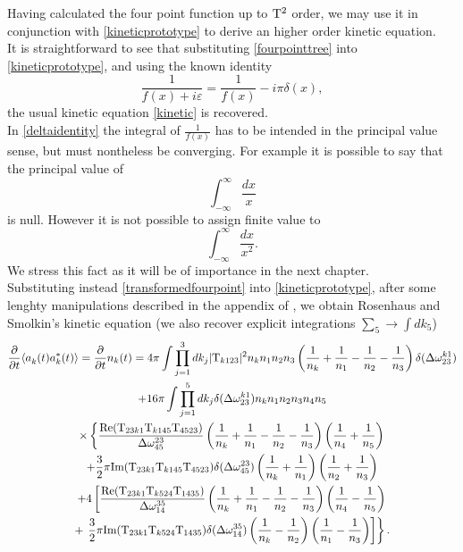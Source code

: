 Having calculated the four point function up to $\mathrm{T}^2$ order, we may use it in conjunction with \eqref{kineticprototype} to derive an higher order kinetic equation.\\
It is straightforward to see that substituting \eqref{fourpointtree} into \eqref{kineticprototype}, and using the known identity
\begin{equation}
    \frac{1}{f(x) + i\varepsilon} = \frac{1}{f(x)} -i\pi\delta(x),
    \label{deltaidentity}
\end{equation}
the usual kinetic equation \eqref{kinetic} is recovered. \\
In \eqref{deltaidentity} the integral of $\frac{1}{f(x)}$ has to be intended in the principal value sense, but must nontheless be converging. For example it is possible to say that the principal value 
of 
\begin{equation}
    \int_{-\infty}^{\infty}\frac{dx}{x}
\end{equation} 
is null. However it is not possible to assign finite value to 
\begin{equation}
    \int_{-\infty}^{\infty} \frac{dx}{x^2}.
\end{equation}
We stress this fact as it will be of importance in the next chapter. \\
Substituting instead \eqref{transformedfourpoint} into \eqref{kineticprototype}, after some lenghty manipulations described in the appendix of \cite{Rosenhaus2023},
we obtain Rosenhaus and Smolkin's kinetic equation (we also recover explicit integrations $\sum_5 \rightarrow \int dk_5$)
\begin{multline}
        \frac{\partial}{\partial t} \langle a_k^{}(t) a_k^{*}(t) \rangle = \frac{\partial}{\partial t} n_k(t) = 4\pi \int \prod_{j=1}^{3} dk_j|\mathrm{T}_{k123}|^2n_kn_1n_2n_3\left(\frac{1}{n_k} +\frac{1}{n_1}-
        \frac{1}{n_2}-\frac{1}{n_3}\right)\delta(\Delta{\omega}^{k1}_{23}) \\
          + 16\pi\int \prod_{j=1}^{5} dk_j\delta(\Delta{\omega}^{k1}_{23})n_kn_1n_2n_3n_4n_5 \\
          \times \left\{  \dfrac{\text{Re}(\mathrm{T}_{23k1}\mathrm{T}_{k145}\mathrm{T}_{4523})}{\Delta{\omega}^{23}_{45}}
          \left(\frac{1}{n_k} +\frac{1}{n_1} -\frac{1}{n_2} - \frac{1}{n_3}\right)\left(\frac{1}{n_4}+\frac{1}{n_5}\right)  \right. \\
          + \frac{3}{2}\pi\text{Im}(\mathrm{T}_{23k1}\mathrm{T}_{k145}\mathrm{T}_{4523})\delta(\Delta{\omega}^{23}_{45})\left(\frac{1}{n_k}+\frac{1}{n_1}\right)\left(\frac{1}{n_2}
          +\frac{1}{n_3}\right) \\
            + 4\left[\dfrac{\text{Re}(\mathrm{T}_{23k1}\mathrm{T}_{k524}\mathrm{T}_{1435})}{\Delta{\omega}^{35}_{14}}
            \left(\frac{1}{n_k} +\frac{1}{n_1} -\frac{1}{n_2} - \frac{1}{n_3}\right)\left(\frac{1}{n_4}-\frac{1}{n_5}\right)\right. \\
            + \left. \left. \frac{3}{2}\pi\text{Im}(\mathrm{T}_{23k1}\mathrm{T}_{k524}\mathrm{T}_{1435})\delta(\Delta{\omega}^{35}_{14})\left(\frac{1}{n_k}-
            \frac{1}{n_2}\right)\left(\frac{1}{n_1}-\frac{1}{n_3}\right)  \right]\right\}.
            \label{NLOkinetic}
\end{multline}
